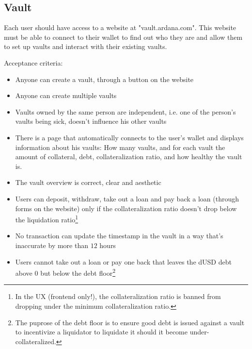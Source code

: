 \documentclass{article} %
\begin{document}
\subsection{Vault}

Each user should have access to a website at "vault.ardana.com".
This website must be able to connect to their wallet to find out who they are
and allow them to set up vaults and interact with their existing vaults.

Acceptance criteria:
\begin{itemize}
  \item Anyone can create a vault, through a button on the website
  \item Anyone can create multiple vaults
  \item Vaults owned by the same person are independent, i.e. one of the
    person's vaults being sick, doesn't influence his other vaults
  \item There is a page that automatically connects to the user's wallet and
    displays information about his vaults: How many vaults, and for each vault
    the amount of collateral, debt, collateralization ratio, and how healthy the
    vault is.
  \item The vault overview is correct, clear and aesthetic
  \item Users can deposit, withdraw, take out a loan and pay back a loan
    (through forms on the website) only if the collateralization ratio doesn't
    drop below the liquidation ratio\footnote{
      In the UX (frontend only!), the collateralization ratio is banned from
      dropping under the minimum collateralization ratio.}
  \item No transaction can update the timestamp in the vault in a way that's
    inaccurate by more than $12$ hours
  \item Users cannot take out a loan or pay one back that leaves the dUSD debt
    above $0$ but below the debt floor\footnote{
    The puprose of the debt floor is to ensure good debt is issued against a
    vault to incentivize a liquidator to liquidate it should it become
    under-collateralized.}
% 


\end{itemize}
\end{document}

